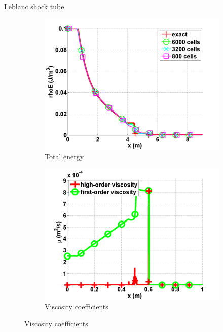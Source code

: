 \documentclass[xcolor=dvipsnames,10pt]{beamer}
\begin{document}
\begin{frame}{Leblanc shock tube}
\begin{figure}[H]
        \begin{subfigure}[b]{0.37\textwidth}
                \centering
                \includegraphics[width=\textwidth]{../figures/Leblanc_exact_and_numerical_stt_total_energy_6000.png}
                \caption{Total energy}
                \label{fig:1d_leblanc_press}
        \end{subfigure}
        \begin{subfigure}[b]{0.37\textwidth}
                \centering
                \includegraphics[width=\textwidth]{../figures/Leblanc_viscosity_numerical_6000.png}
                \caption{Viscosity coefficients}
                \label{fig:1d_leblanc_visc}
        \end{subfigure}
\end{figure}
\end{frame}
\end{document}

